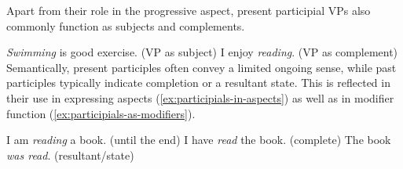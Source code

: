 Apart from their role in the progressive aspect, present participial VPs also commonly function as subjects and complements.

\ea
\ea \emph{Swimming} is good exercise. \hfill(VP as subject)
\ex I enjoy \emph{reading}. \hfill(VP as complement)
\z\z
Semantically, present participles often convey a limited ongoing sense, while past participles typically indicate completion or a resultant state. This is reflected in their use in expressing aspects (\ref{ex:participials-in-aspects}) as well as in modifier function (\ref{ex:participials-as-modifiers}).

\ea \label{ex:participials-in-aspects}
\ea I am \emph{reading} a book. \hfill(until the end)
\ex I have \emph{read} the book. \hfill(complete)
\ex The book \emph{was read}. \hfill(resultant/state)
\z\z
{}

